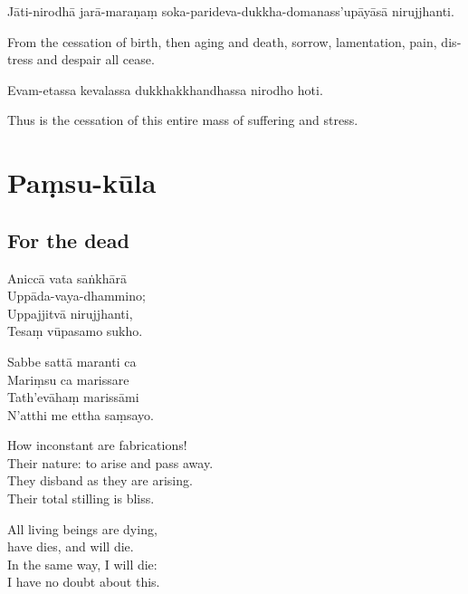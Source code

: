 Jāti-nirodhā jarā-maraṇaṃ soka-parideva-dukkha-domanass'upāyāsā nirujjhanti.

\begin{english}
  From the cessation of birth, then aging and death, sorrow, lamentation, pain,
  distress and despair all cease.
\end{english}

Evam-etassa kevalassa dukkhakkhandhassa nirodho hoti.

\begin{english}
  Thus is the cessation of this entire mass of suffering and stress.
\end{english}



\section{Paṃsu-kūla}

\subsection{For the dead}



Aniccā vata saṅkhārā\\
Uppāda-vaya-dhammino;\\
Uppajjitvā nirujjhanti,\\
Tesaṃ vūpasamo sukho.

Sabbe sattā maranti ca\\
Mariṃsu ca marissare\\
Tath'evāhaṃ marissāmi\\
N'atthi me ettha saṃsayo.

\begin{english}
  How inconstant are fabrications!\\
  Their nature: to arise and pass away.\\
  They disband as they are arising.\\
  Their total stilling is bliss.

  All living beings are dying,\\
  have dies, and will die.\\
  In the same way, I will die:\\
  I have no doubt about this.
\end{english}

